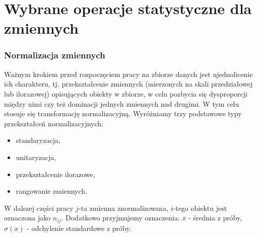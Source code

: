 \documentclass[12pt,a4paper]{report}
\begin{document}
\section{Wybrane operacje statystyczne dla zmiennych}\label{wybrane_operacje_statystyczne}
\subsubsection{Normalizacja zmiennych}
Ważnym krokiem przed rozpoczęciem pracy na zbiorze danych jest ujednolicenie ich charakteru, tj. przekształcenie zmiennych (mierzonych na skali przedziałowej lub ilorazowej) opisujących obiekty w zbiorze, w celu pozbycia się dysproporcji między nimi czy też dominacji jednych zmiennych nad drugimi. W tym celu stosuje się transformację normalizacyjną. Wyróżniamy trzy podstawowe typy przekształceń normalizacyjnych:
\begin{itemize}
\item standaryzacja,
\item unitaryzacja,
\item przekształcenie ilorazowe,
\item rangowanie zmiennych.
\end{itemize}
W dalszej części pracy $j$-ta zmienna znormalizowana, $i$-tego obiektu jest oznaczona jako $n_{ij}$. Dodatkowo przyjmujemy oznaczenia: $\overline{x}$ - średnia z próby, $\sigma{(x)}$ - odchylenie standardowe z próby.
\end{document}
